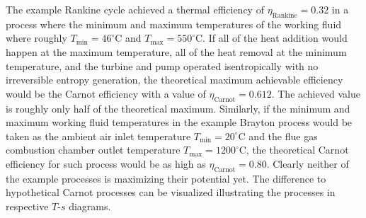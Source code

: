 The example Rankine cycle achieved a thermal efficiency of $\eta_\text{Rankine}=0.32$ in a process where the minimum and maximum temperatures of the working fluid where roughly $T_\text{min}=46^\circ\text{C}$ and $T_\text{max}=550^\circ\text{C}$. If all of the heat addition would happen at the maximum temperature, all of the heat removal at the minimum temperature, and the turbine and pump operated isentropically with no irreversible entropy generation, the theoretical maximum achievable efficiency would be the Carnot efficiency with a value of $\eta_\text{Carnot}=0.612$. The achieved value is roughly only half of the theoretical maximum. Similarly, if the minimum and maximum working fluid temperatures in the example Brayton process would be taken as the ambient air inlet temperature $T_\text{min}=20^\circ\text{C}$ and the flue gas combustion chamber outlet temperature $T_\text{max}=1200^\circ\text{C}$, the theoretical Carnot efficiency for such process would be as high as $\eta_\text{Carnot}=0.80$. Clearly neither of the example processes is maximizing their potential yet. The difference to hypothetical Carnot processes can be visualized illustrating the processes in respective $T$-$s$ diagrams. 

